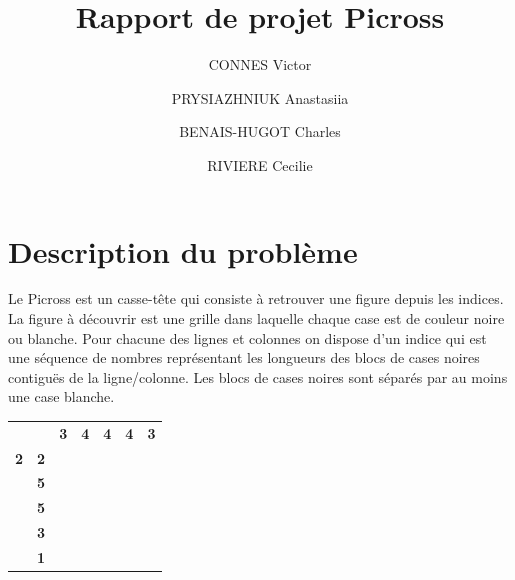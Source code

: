 \documentclass{article}
\begin{document}
\title{Rapport de projet Picross}
\author{CONNES Victor \and PRYSIAZHNIUK Anastasiia \and BENAIS-HUGOT Charles \and RIVIERE Cecilie}
\maketitle
\tableofcontents 
\newpage
\section{Description du problème}

Le Picross est un casse-tête qui consiste à retrouver une figure depuis les indices. La figure à découvrir est une grille dans laquelle chaque case est de couleur noire ou blanche. Pour chacune des lignes et colonnes on dispose d'un indice qui est une séquence de nombres représentant les longueurs des blocs de cases noires contiguës de la ligne/colonne. Les blocs de cases noires sont séparés par au moins une case blanche.

\begin{table}[h]
\centering
\begin{tabular}{ccccccc}
\textbf{}  & \textbf{}                       & \textbf{3}                     & \textbf{4}                     & \textbf{4}                     & \textbf{4}                     & \textbf{3}                     \\ \cline{3-7} 
\textbf{2} & \multicolumn{1}{c|}{\textbf{2}} & \multicolumn{1}{c|}{\textbf{}} & \multicolumn{1}{c|}{\textbf{}} & \multicolumn{1}{c|}{\textbf{}} & \multicolumn{1}{c|}{\textbf{}} & \multicolumn{1}{c|}{\textbf{}} \\ \cline{3-7} 
\textbf{}  & \multicolumn{1}{c|}{\textbf{5}} & \multicolumn{1}{c|}{\textbf{}} & \multicolumn{1}{c|}{\textbf{}} & \multicolumn{1}{c|}{\textbf{}} & \multicolumn{1}{c|}{\textbf{}} & \multicolumn{1}{c|}{\textbf{}} \\ \cline{3-7} 
\textbf{}  & \multicolumn{1}{c|}{\textbf{5}} & \multicolumn{1}{c|}{\textbf{}} & \multicolumn{1}{c|}{\textbf{}} & \multicolumn{1}{c|}{\textbf{}} & \multicolumn{1}{c|}{\textbf{}} & \multicolumn{1}{c|}{\textbf{}} \\ \cline{3-7} 
\textbf{}  & \multicolumn{1}{c|}{\textbf{3}} & \multicolumn{1}{c|}{\textbf{}} & \multicolumn{1}{c|}{\textbf{}} & \multicolumn{1}{c|}{\textbf{}} & \multicolumn{1}{c|}{\textbf{}} & \multicolumn{1}{c|}{\textbf{}} \\ \cline{3-7} 
\textbf{}  & \multicolumn{1}{c|}{\textbf{1}} & \multicolumn{1}{c|}{\textbf{}} & \multicolumn{1}{c|}{\textbf{}} & \multicolumn{1}{c|}{\textbf{}} & \multicolumn{1}{c|}{\textbf{}} & \multicolumn{1}{c|}{\textbf{}} \\ \cline{3-7} 
\end{tabular}
\end{table}
\end{document}
